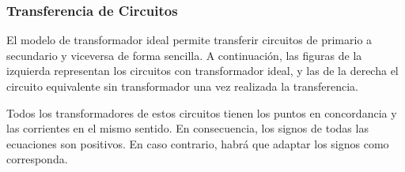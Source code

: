   \subsubsection{Transferencia de Circuitos}
\label{sec:transferencia-circuitos}

El modelo de transformador ideal permite transferir circuitos de primario a secundario y viceversa de forma sencilla. A continuación, las figuras de la izquierda representan los circuitos con transformador ideal, y las de la derecha el circuito equivalente sin transformador una vez realizada la transferencia.

Todos los transformadores de estos circuitos tienen los puntos en concordancia y las corrientes en el mismo sentido. En consecuencia, los signos de todas las ecuaciones son positivos. En caso contrario, habrá que adaptar los signos como corresponda.  

\pagebreak[4]

